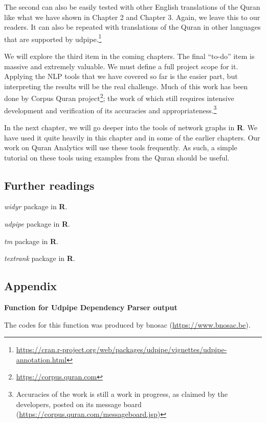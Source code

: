 \documentclass[
]{article}
\begin{document}
The second can also be easily tested with other English translations of the Quran like what we have shown in Chapter 2 and Chapter 3. Again, we leave this to our readers. It can also be repeated with translations of the Quran in other languages that are supported by udpipe.\footnote{\url{https://cran.r-project.org/web/packages/udpipe/vignettes/udpipe-annotation.html}}

We will explore the third item in the coming chapters. The final ``to-do'' item is massive and extremely valuable. We must define a full project scope for it. Applying the NLP tools that we have covered so far is the easier part, but interpreting the results will be the real challenge. Much of this work has been done by Corpus Quran project\footnote{\url{https://corpus.quran.com}}; the work of which still requires intensive development and verification of its accuracies and appropriateness.\footnote{Accuracies of the work is still a work in progress, as claimed by the developers, posted on its message board (\url{https://corpus.quran.com/messageboard.jsp})}

In the next chapter, we will go deeper into the tools of network graphs in \textbf{R}. We have used it quite heavily in this chapter and in some of the earlier chapters. Our work on Quran Analytics will use these tools frequently. As such, a simple tutorial on these tools using examples from the Quran should be useful.

\hypertarget{further-readings-3}{%
\subsection{Further readings}\label{further-readings-3}}

\emph{widyr} package in \textbf{R}. \citep{widyr}

\emph{udpipe} package in \textbf{R}. \citep{udpipe}

\emph{tm} package in \textbf{R}. \citep{tm}

\emph{textrank} package in \textbf{R}. \citep{textrank}

\newpage

\hypertarget{appendix}{%
\subsection*{Appendix}\label{appendix}}

\textbf{Function for Udpipe Dependency Parser output}

The codes for this function was produced by bnosac (\url{https://www.bnosac.be}).
\end{document}
